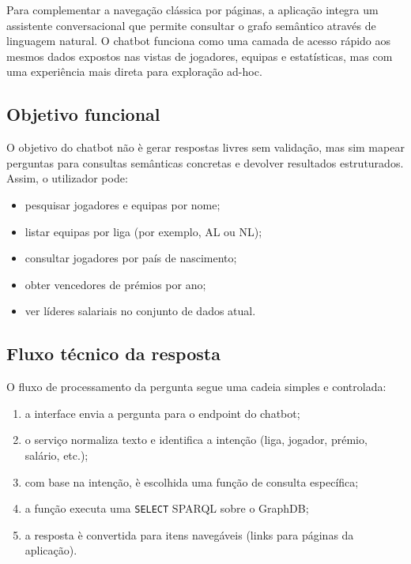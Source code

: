 Para complementar a navega\c{c}\~ao cl\'assica por p\'aginas, a aplica\c{c}\~ao integra um assistente conversacional que permite consultar o grafo sem\^antico atrav\'es de linguagem natural. O chatbot funciona como uma camada de acesso r\'apido aos mesmos dados expostos nas vistas de jogadores, equipas e estat\'isticas, mas com uma experi\^encia mais direta para explora\c{c}\~ao ad-hoc.

\subsection{Objetivo funcional}

O objetivo do chatbot n\~ao \`e gerar respostas livres sem valida\c{c}\~ao, mas sim mapear perguntas para consultas sem\^anticas concretas e devolver resultados estruturados. Assim, o utilizador pode:

\begin{itemize}[leftmargin=*]
    \item pesquisar jogadores e equipas por nome;
    \item listar equipas por liga (por exemplo, AL ou NL);
    \item consultar jogadores por pa\'is de nascimento;
    \item obter vencedores de pr\'emios por ano;
    \item ver l\'ideres salariais no conjunto de dados atual.
\end{itemize}

\subsection{Fluxo t\'ecnico da resposta}

O fluxo de processamento da pergunta segue uma cadeia simples e controlada:

\begin{enumerate}[leftmargin=*]
    \item a interface envia a pergunta para o endpoint do chatbot;
    \item o servi\c{c}o normaliza texto e identifica a inten\c{c}\~ao (liga, jogador, pr\'emio, sal\'ario, etc.);
    \item com base na inten\c{c}\~ao, \`e escolhida uma fun\c{c}\~ao de consulta espec\'ifica;
    \item a fun\c{c}\~ao executa uma \texttt{SELECT} SPARQL sobre o GraphDB;
    \item a resposta \`e convertida para itens naveg\'aveis (links para p\'aginas da aplica\c{c}\~ao).
\end{enumerate}

